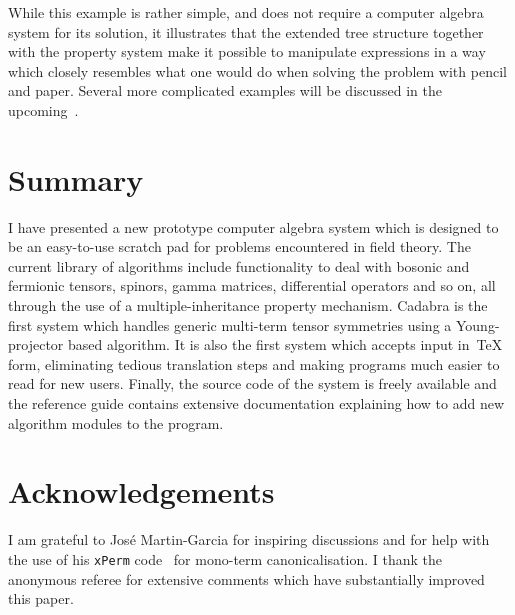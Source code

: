 \documentclass{elsart}
\begin{document}
While this example is rather simple, and does not require a computer
algebra system for its solution, it illustrates that the extended tree
structure together with the property system make it possible to
manipulate expressions in a way which closely resembles what one would
do when solving the problem with pencil and paper. Several more
complicated examples will be discussed in the
upcoming~\cite{kas_cdb_hep}.


\section{Summary}

I have presented a new prototype computer algebra system which is
designed to be an easy-to-use scratch pad for problems encountered in
field theory. The current library of algorithms include functionality
to deal with bosonic and fermionic tensors, spinors, gamma matrices,
differential operators and so on, all through the use of a
multiple-inheritance property mechanism. Cadabra is the first system
which handles generic multi-term tensor symmetries using a
Young-projector based algorithm. It is also the first system which
accepts input in~\TeX{} form, eliminating tedious translation steps
and making programs much easier to read for new users. Finally, the
source code of the system is freely available and the reference guide
contains extensive documentation explaining how to add new algorithm
modules to the program.


\section*{Acknowledgements}

I am grateful to Jos\'e Martin-Garcia for inspiring discussions and
for help with the use of his {\tt xPerm} code~\cite{e_xact} for
mono-term canonicalisation. I thank the anonymous referee for
extensive comments which have substantially improved this paper.
\end{document}
